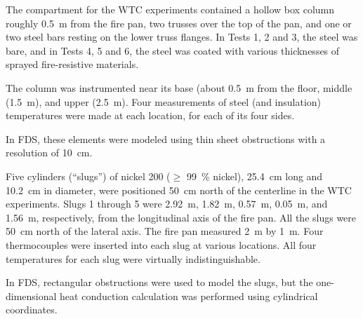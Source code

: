 The compartment for the WTC experiments contained a hollow box column roughly 0.5~m from the fire pan, two trusses over the top
of the pan, and one or two steel bars resting on the lower truss flanges. In Tests 1, 2 and 3, the steel was bare, and in Tests 4, 5 and 6, the
steel was coated with various thicknesses of sprayed fire-resistive materials.

The column was instrumented near its base (about
0.5~m from the floor, middle (1.5~m), and upper (2.5~m). Four measurements of steel (and insulation) temperatures were made at each location, for
each of its four sides.

In FDS, these elements were modeled using thin sheet obstructions with a resolution of 10~cm.

Five cylinders (``slugs'') of nickel 200 ($\ge$ 99~\% nickel), 25.4~cm long and 10.2~cm in diameter, were positioned
50~cm north of the centerline in the WTC experiments. Slugs 1 through 5 were 2.92~m, 1.82~m, 0.57~m, 0.05~m, and 1.56~m, respectively, from the
longitudinal axis of the fire pan. All the slugs were 50~cm north of the lateral axis. The fire pan measured 2~m by 1~m. Four thermocouples were
inserted into each slug at various locations. All four temperatures for each slug were virtually indistinguishable.

In FDS, rectangular obstructions were used to model the slugs, but the one-dimensional heat conduction calculation was performed using
cylindrical coordinates.

\newpage



